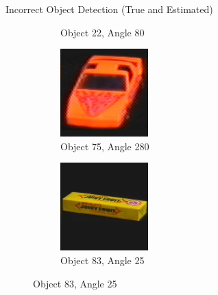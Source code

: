 \documentclass[aspectratio=169, handout, 10pt, hyperref=colorlinks]{beamer}
\begin{document}
\begin{frame}{Incorrect Object Detection (True and Estimated)}
\begin{figure}
\begin{subfigure}{0.32\linewidth}
            \caption{Object 22, Angle 80}
        \end{subfigure}
        \begin{subfigure}{0.32\linewidth}
            \centering
            \includegraphics[width = 0.6\linewidth]{incorrect/obj76__280.png}
            \vspace{1em}
            \caption{Object 75, Angle 280}
        \end{subfigure}
        \begin{subfigure}{0.32\linewidth}
            \centering
            \includegraphics[width = 0.6\linewidth]{incorrect/obj84__25.png}
            \vspace{1em}
            \caption{Object 83, Angle 25}
        \end{subfigure}
    \end{figure}
\end{frame}
\end{document}
